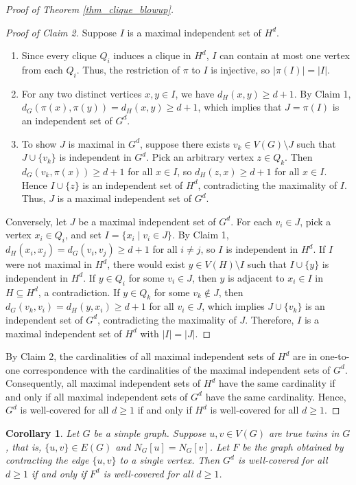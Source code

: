 \documentclass[12pt]{amsart}
\numberwithin{equation}{section}
\newtheorem{cor}[thm]{\bf Corollary}
\theoremstyle{definition}
\begin{document}
\begin{proof}[Proof of Theorem \ref{thm_clique_blowup}]
\begin{proof}[Proof of Claim 2]
Suppose $I$ is a maximal independent set of $H^d$. 
\begin{enumerate}
    \item Since every clique $Q_i$ induces a clique in $H^d$, $I$ can contain at most one vertex from each $Q_i$. Thus, the restriction of $\pi$ to $I$ is injective, so $|\pi(I)| = |I|$.
    \item For any two distinct vertices $x, y \in I$, we have $d_H(x, y) \ge d+1$. By Claim 1, $d_G(\pi(x), \pi(y)) = d_H(x,y) \ge d+1$, which implies that $J = \pi(I)$ is an independent set of $G^d$.
    \item To show $J$ is maximal in $G^d$, suppose there exists $v_k \in V(G) \setminus J$ such that $J \cup \{v_k\}$ is independent in $G^d$. Pick an arbitrary vertex $z \in Q_k$. Then $d_G(v_k, \pi(x)) \ge d+1$ for all $x \in I$, so $d_H(z, x) \ge d+1$ for all $x \in I$. Hence $I \cup \{z\}$ is an independent set of $H^d$, contradicting the maximality of $I$. Thus, $J$ is a maximal independent set of $G^d$.
\end{enumerate}

Conversely, let $J$ be a maximal independent set of $G^d$. For each $v_i \in J$, pick a vertex $x_i \in Q_i$, and set $I = \{x_i \mid v_i \in J\}$. By Claim 1, $d_H(x_i, x_j) = d_G(v_i, v_j) \ge d+1$ for all $i \neq j$, so $I$ is independent in $H^d$. If $I$ were not maximal in $H^d$, there would exist $y \in V(H) \setminus I$ such that $I \cup \{y\}$ is independent in $H^d$. If $y \in Q_i$ for some $v_i \in J$, then $y$ is adjacent to $x_i \in I$ in $H \subseteq H^d$, a contradiction. If $y \in Q_k$ for some $v_k \notin J$, then $d_G(v_k, v_i) = d_H(y, x_i) \ge d+1$ for all $v_i \in J$, which implies $J \cup \{v_k\}$ is an independent set of $G^d$, contradicting the maximality of $J$. Therefore, $I$ is a maximal independent set of $H^d$ with $|I| = |J|$.
\end{proof}

By Claim 2, the cardinalities of all maximal independent sets of $H^d$ are in one-to-one correspondence with the cardinalities of the maximal independent sets of $G^d$. Consequently, all maximal independent sets of $H^d$ have the same cardinality if and only if all maximal independent sets of $G^d$ have the same cardinality. Hence, $G^d$ is well-covered for all $d \ge 1$ if and only if $H^d$ is well-covered for all $d \ge 1$.
\end{proof}

\begin{cor}\label{cor_twins}
Let $G$ be a simple graph. Suppose $u, v \in V(G)$ are true twins in $G$, that is, $\{u,v\} \in E(G)$ and $N_G[u] = N_G[v]$. Let $F$ be the graph obtained by contracting the edge $\{u,v\}$ to a single vertex. Then $G^d$ is well-covered for all $d \ge 1$ if and only if $F^d$ is well-covered for all $d \ge 1$.
\end{cor}
\end{document}
